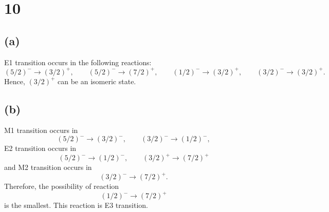 \documentclass[a4paper,11pt]{jsarticle}
\begin{document}
\section*{10}

\subsection*{(a)}

E1 transition occurs in the following reactions:
\begin{equation}
  (5/2)^{-}\to (3/2)^{+},\qquad (5/2)^{-}\to (7/2)^{+},\qquad (1/2)^{-}\to (3/2)^{+},\qquad (3/2)^{-}\to (3/2)^{+}.
\end{equation}
Hence, $(3/2)^{+}$ can be an isomeric state.

\subsection*{(b)}

M1 transition occurs in 
\begin{equation}
  (5/2)^{-} \to (3/2)^{-},\qquad (3/2)^{-}\to (1/2)^{-},
\end{equation}
E2 transition occurs in
\begin{equation}
  (5/2)^{-} \to (1/2)^{-}, \qquad (3/2)^{+}\to (7/2)^{+}
\end{equation}
and M2 transition occurs in
\begin{equation}
  (3/2)^{-}\to (7/2)^{+}.
\end{equation}
Therefore, the possibility of reaction
\begin{equation}
  (1/2)^{-}\to (7/2)^{+}
\end{equation} 
is the smallest.
This reaction is E3 transition.
\end{document}
